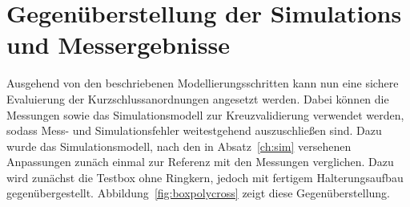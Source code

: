 \section{Gegen\"uberstellung der Simulations und Messergebnisse}
Ausgehend von den beschriebenen Modellierungsschritten kann nun eine sichere Evaluierung der Kurzschlussanordnungen angesetzt werden. Dabei k\"onnen die Messungen sowie das Simulationsmodell zur Kreuzvalidierung verwendet werden, sodass Mess- und Simulationsfehler weitestgehend auszuschlie\ss{}en sind. Dazu wurde das Simulationsmodell, nach den in Absatz~\ref{ch:sim} versehenen Anpassungen zun\"ach einmal zur Referenz mit den Messungen verglichen. Dazu wird zun\"achst die Testbox ohne Ringkern, jedoch mit fertigem Halterungsaufbau gegen\"ubergestellt. Abbildung~\ref{fig:boxpolycross} zeigt diese Gegen\"uberstellung.

